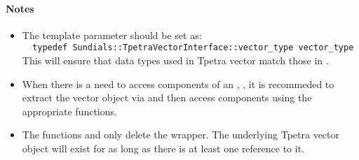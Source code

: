 \paragraph{\bf Notes}

\begin{itemize}

\item

  The template parameter  should be set as:\\
  \verb|  typedef Sundials::TpetraVectorInterface::vector_type vector_type|\\
   This will ensure that data types used in Tpetra vector match those in {\sundials}.

\item
  When there is a need to access components of an , ,
  it is recommeded to extract the {\trilinos} vector object via
   and then access components using
  the appropriate {\trilinos} functions.

\item
  The functions  and 
  only delete the  wrapper. The underlying Tpetra vector object will exist for as long as
  there is at least one reference to it.

\end{itemize}
